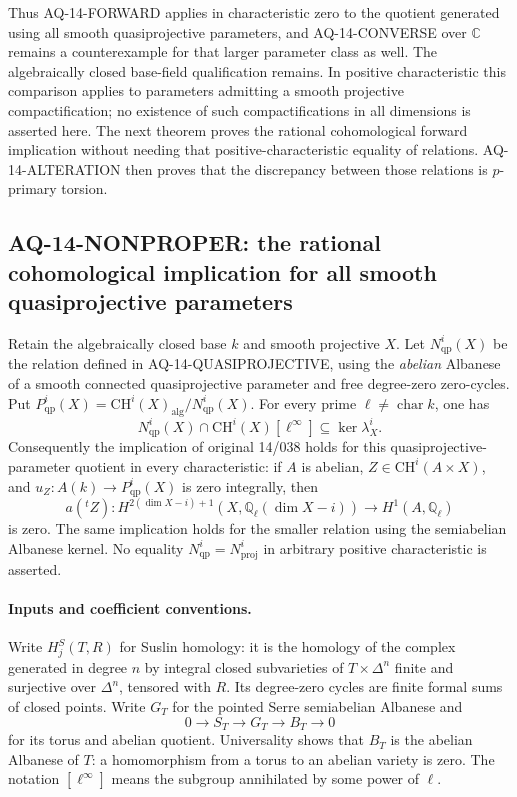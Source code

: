 Thus AQ-14-FORWARD applies in characteristic zero to the
quotient generated using all smooth quasiprojective
parameters, and AQ-14-CONVERSE over $\mathbb C$ remains
a counterexample for that larger parameter class as
well. The algebraically closed base-field qualification
remains. In positive characteristic this comparison
applies to parameters admitting a smooth projective
compactification; no existence of such compactifications
in all dimensions is asserted here. The next theorem proves the
rational cohomological forward implication without needing that
positive-characteristic equality of relations. AQ-14-ALTERATION then proves that the discrepancy between those relations is $p$-primary torsion.

\subsection{AQ-14-NONPROPER: the rational cohomological implication for all smooth quasiprojective parameters}
Retain the algebraically closed base $k$ and smooth projective $X$.
Let $N^i_{\mathrm{qp}}(X)$ be the relation defined in
AQ-14-QUASIPROJECTIVE, using the \emph{abelian} Albanese of a
smooth connected quasiprojective parameter and free degree-zero
zero-cycles. Put
$P^i_{\mathrm{qp}}(X)=\mathrm{CH}^i(X)_{\mathrm{alg}}/
N^i_{\mathrm{qp}}(X)$. For every prime
$\ell\ne\operatorname{char}k$, one has
\[
 N^i_{\mathrm{qp}}(X)\cap\mathrm{CH}^i(X)[\ell^\infty]
       \subseteq\ker\lambda_X^i.                            \tag{AQ.14.2}
\]
Consequently the implication of original 14/038 holds for this
quasiprojective-parameter quotient in every characteristic:
if $A$ is abelian, $Z\in\mathrm{CH}^i(A\times X)$, and
$u_Z:A(k)\to P^i_{\mathrm{qp}}(X)$ is zero integrally, then
\[
 a({}^tZ):H^{2(\dim X-i)+1}(X,\mathbb Q_\ell(\dim X-i))
                       \longrightarrow H^1(A,\mathbb Q_\ell)
\]
is zero. The same implication holds for the smaller relation
using the semiabelian Albanese kernel. No equality
$N^i_{\mathrm{qp}}=N^i_{\mathrm{proj}}$ in arbitrary positive
characteristic is asserted.

\paragraph{Inputs and coefficient conventions.}
Write $H_j^S(T,R)$ for Suslin homology: it is the homology of
the complex generated in degree $n$ by integral closed
subvarieties of $T\times\Delta^n$ finite and surjective over
$\Delta^n$, tensored with $R$. Its degree-zero cycles are
finite formal sums of closed points. Write $G_T$ for the
pointed Serre semiabelian Albanese and
\[
 0\longrightarrow S_T\longrightarrow G_T\longrightarrow B_T
       \longrightarrow0
\]
for its torus and abelian quotient. Universality shows that
$B_T$ is the abelian Albanese of $T$: a homomorphism from a
torus to an abelian variety is zero. The notation $[\ell^\infty]$
means the subgroup annihilated by some power of $\ell$.

